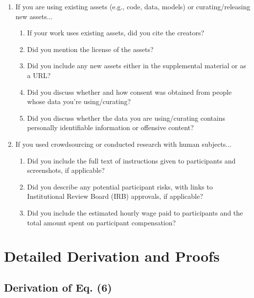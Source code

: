 \documentclass{article}
\begin{document}
\begin{enumerate}
\item If you are using existing assets (e.g., code, data, models) or curating/releasing new assets...
\begin{enumerate}
  \item If your work uses existing assets, did you cite the creators?
  \item Did you mention the license of the assets?
  \item Did you include any new assets either in the supplemental material or as a URL?
  \item Did you discuss whether and how consent was obtained from people whose data you're using/curating?
  \item Did you discuss whether the data you are using/curating contains personally identifiable information or offensive content?
\end{enumerate}

\item If you used crowdsourcing or conducted research with human subjects...
\begin{enumerate}
  \item Did you include the full text of instructions given to participants and screenshots, if applicable?
    \answerNA{}
  \item Did you describe any potential participant risks, with links to Institutional Review Board (IRB) approvals, if applicable?
    \answerNA{}
  \item Did you include the estimated hourly wage paid to participants and the total amount spent on participant compensation?
    \answerNA{}
\end{enumerate}

\end{enumerate}



\newpage

\appendix

\section{Detailed Derivation and Proofs}

\subsection{Derivation of Eq. (6)}
\end{document}
